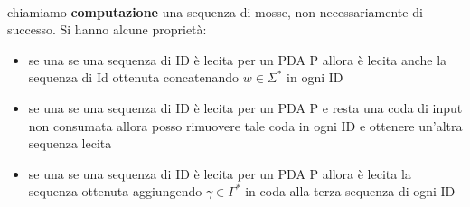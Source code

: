 	\\
	chiamiamo \textbf{computazione }una sequenza di mosse, non necessariamente di successo. Si hanno alcune proprietà:
	\begin{itemize}
		\item se una se una sequenza di ID è lecita per un PDA P allora è lecita anche la sequenza di Id ottenuta concatenando $w\in\Sigma^*$ in ogni ID
		\item se una se una sequenza di ID è lecita per un PDA P e resta una coda di input non consumata allora posso rimuovere tale coda in ogni ID e ottenere un'altra sequenza lecita
		\item se una se una sequenza di ID è lecita per un PDA P allora  è lecita la sequenza ottenuta aggiungendo $\gamma\in\Gamma^*$ in coda alla terza sequenza di ogni ID
	\end{itemize}
